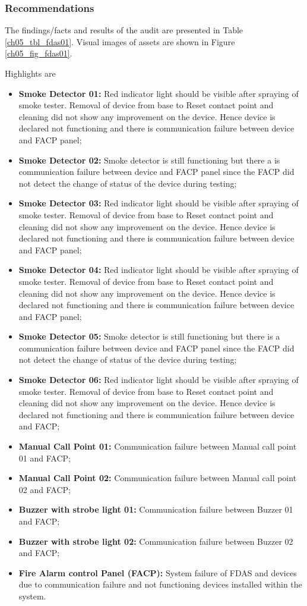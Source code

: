 \subsubsection{Recommendations}

The findings/facts and results of the audit are presented in Table \ref{ch05_tbl_fdas01}. Visual images of assets are shown in Figure \ref{ch05_fig_fdas01}. 

Highlights are

\begin{itemize}
	\item \textbf{Smoke Detector 01:} Red indicator light should be visible after spraying of smoke tester.  Removal of device from base to Reset contact point and cleaning did not show any improvement on the device. Hence device is declared not functioning and there is communication failure between device and FACP panel;
	\item \textbf{Smoke Detector 02:} Smoke detector is still functioning but there a   is communication failure between device and FACP panel  since the  FACP did not detect the change of status of the device during testing; 
	\item \textbf{Smoke Detector 03:} Red indicator light should be visible after spraying of smoke tester.  Removal of device from base to Reset contact point and cleaning did not show any improvement on the device. Hence device is declared not functioning and there is communication failure between device and FACP panel;
	\item \textbf{Smoke Detector 04:} Red indicator light should be visible after spraying of smoke tester.  Removal of device from base to Reset contact point and cleaning did not show any improvement on the device. Hence device is declared not functioning and there is communication failure between device and FACP panel;
	\item \textbf{Smoke Detector 05:} Smoke detector is still functioning but there is a communication failure between device and FACP panel  since the  FACP did not detect the change of status of the device during testing;
	\item \textbf{Smoke Detector 06:} Red indicator light should be visible after spraying of smoke tester.  Removal of device from base to Reset contact point and cleaning did not show any improvement on the device. Hence device is declared not functioning and there is communication failure between device and FACP;
	\item \textbf{Manual Call Point 01:} Communication failure between Manual call point 01 and FACP;
	\item \textbf{Manual Call Point 02:} Communication failure between Manual call point 02 and FACP; 
	\item \textbf{Buzzer with strobe light 01:} Communication failure between Buzzer  01 and FACP;
	\item \textbf{Buzzer with strobe light 02:} Communication failure between Buzzer 02 and FACP;
	\item \textbf{Fire Alarm control Panel (FACP):} System failure of FDAS  and devices  due to communication failure and not functioning devices installed within the system.
\end{itemize}

